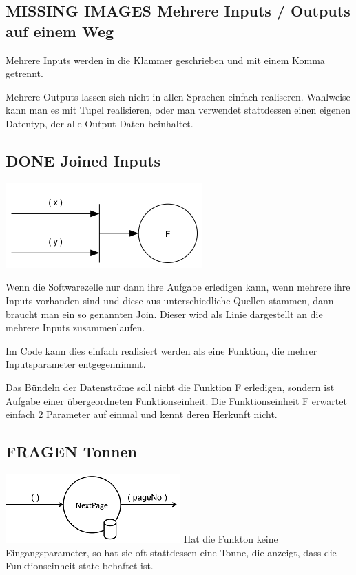 \documentclass[11pt]{article}
\begin{document}
\subsection{{\bfseries\sffamily MISSING IMAGES} Mehrere Inputs / Outputs auf einem Weg}
\label{sec:orgheadline20}
Mehrere Inputs werden in die Klammer geschrieben und mit einem Komma getrennt.

Mehrere Outputs lassen sich nicht in allen Sprachen einfach realiseren.
Wahlweise kann man es mit Tupel realisieren, oder man verwendet stattdessen
einen eigenen Datentyp, der alle Output-Daten beinhaltet.

\subsection{{\bfseries\sffamily DONE} Joined Inputs}
\label{sec:orgheadline21}
\includegraphics[width=.9\linewidth]{./img/diagramJoin.png}

Wenn die Softwarezelle nur dann ihre Aufgabe erledigen kann, wenn mehrere ihre Inputs 
vorhanden sind und diese aus unterschiedliche Quellen stammen, dann braucht man ein so genannten Join.
Dieser wird als Linie dargestellt an die mehrere Inputs zusammenlaufen.

Im Code kann dies einfach realisiert werden als eine Funktion, die mehrer Inputsparameter entgegennimmt.

Das Bündeln der Datenströme soll nicht die Funktion F erledigen, sondern ist Aufgabe einer übergeordneten Funktionseinheit.
Die Funktionseinheit F erwartet einfach 2 Parameter auf einmal und kennt deren Herkunft nicht. 

\subsection{{\bfseries\sffamily FRAGEN} Tonnen}
\label{sec:orgheadline22}

\includegraphics[width=.9\linewidth]{./img/diagramTonne.png}
Hat die Funkton keine Eingangsparameter, so hat sie oft stattdessen eine Tonne, die anzeigt, dass die Funktionseinheit state-behaftet ist.
\end{document}
